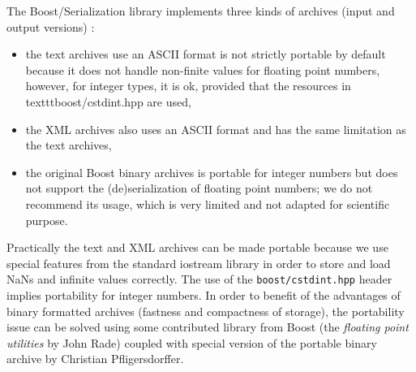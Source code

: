 \documentclass[a4paper,12pt]{article}
\begin{document}
The  Boost/Serialization  library implements  three  kinds of  archives
(input and output versions) :
\begin{itemize}

\item the text archives use an  ASCII format is not strictly portable
by default because it does not handle non-finite values for
 floating point numbers, however, for integer types, it is ok,
provided that the resources in texttt{boost/cstdint.hpp} are used,





\item the XML archives also uses an ASCII format and has the same
limitation as the text archives,

\item  the original  Boost  binary archives  is  portable for  integer
  numbers but does not support the (de)serialization of floating point
  numbers; we  do not recommend its  usage, which is  very limited and
  not adapted for scientific purpose.

\end{itemize}

Practically the text and XML  archives can be made portable because we
use special  features from the  standard iostream library in  order to
store and  load NaNs  and infinite values  correctly.  The use  of the
\texttt{boost/cstdint.hpp}  header  implies  portability  for  integer
numbers.  In  order to benefit  of the advantages of  binary formatted
archives (fastness and compactness  of storage), the portability issue
can  be  solved  using   some  contributed  library  from  Boost  (the
\emph{floating  point utilities}  by John  Rade) coupled  with special
version of the portable binary archive by Christian Pfligersdorffer.

\end{document}
